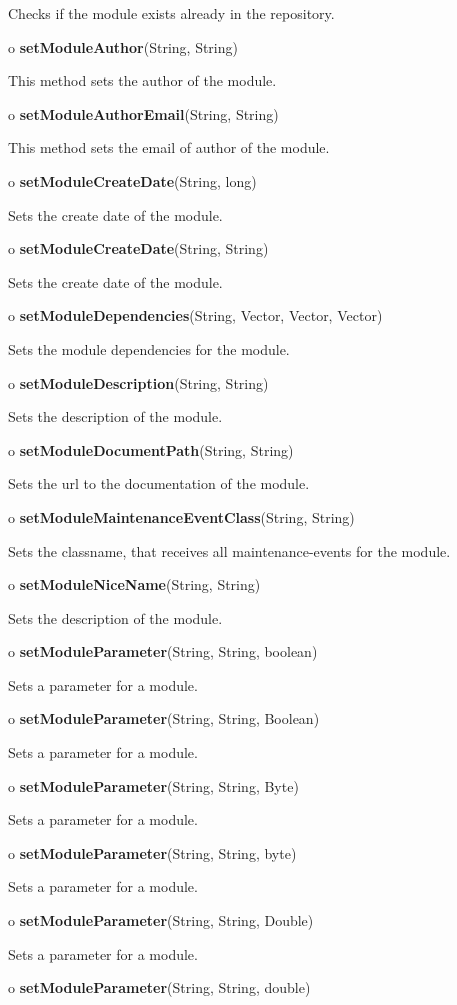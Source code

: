 \begin{description}
Checks if the module exists already in the repository.  
\item o {\bf setModuleAuthor}(String, String)  

This method sets the author of the module.  
\item o {\bf setModuleAuthorEmail}(String, String)  

This method sets the email of author of the module.  
\item o {\bf setModuleCreateDate}(String, long)  

Sets the create date of the module.  
\item o {\bf setModuleCreateDate}(String, String)  

Sets the create date of the module.  
\item o {\bf setModuleDependencies}(String, Vector, Vector, Vector)  

Sets the module dependencies for the module.  
\item o {\bf setModuleDescription}(String, String)  

Sets the description of the module.  
\item o {\bf setModuleDocumentPath}(String, String)  

Sets the url to the documentation of the module.  
\item o {\bf setModuleMaintenanceEventClass}(String, String)  

Sets the classname, that receives all maintenance-events for the module.  
\item o {\bf setModuleNiceName}(String, String)  

Sets the description of the module.  
\item o {\bf setModuleParameter}(String, String, boolean)  

Sets a parameter for a module.  
\item o {\bf setModuleParameter}(String, String, Boolean)  

Sets a parameter for a module.  
\item o {\bf setModuleParameter}(String, String, Byte)  

Sets a parameter for a module.  
\item o {\bf setModuleParameter}(String, String, byte)  

Sets a parameter for a module.  
\item o {\bf setModuleParameter}(String, String, Double)  

Sets a parameter for a module.  
\item o {\bf setModuleParameter}(String, String, double)  


\end{description}
